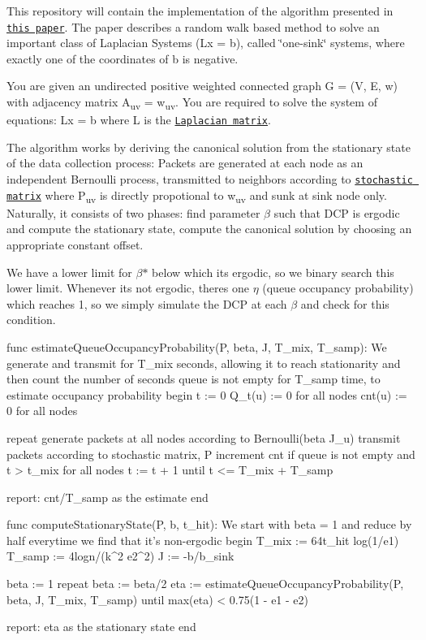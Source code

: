 This repository will contain the implementation of the algorithm presented in \href{https://arxiv.org/abs/1905.04989}{\tt this paper}. The paper describes a random walk based method to solve an important class of Laplacian Systems (Lx = b), called \char`\"{}one-\/sink\char`\"{} systems, where exactly one of the coordinates of b is negative.

You are given an undirected positive weighted connected graph G = (V, E, w) with adjacency matrix A\textsubscript{uv} = w\textsubscript{uv}. You are required to solve the system of equations\+: Lx = b where L is the \href{https://en.wikipedia.org/wiki/Laplacian_matrix#Definition}{\tt Laplacian matrix}.

The algorithm works by deriving the canonical solution from the stationary state of the data collection process\+: Packets are generated at each node as an independent Bernoulli process, transmitted to neighbors according to \href{https://en.wikipedia.org/wiki/Stochastic_matrix#Definition_and_properties}{\tt stochastic matrix} where P\textsubscript{uv} is directly propotional to w\textsubscript{uv} and sunk at sink node only. Naturally, it consists of two phases\+: find parameter {$\beta$} such that D\+CP is ergodic and compute the stationary state, compute the canonical solution by choosing an appropriate constant offset.

We have a lower limit for {$\beta$}$\ast$ below which it\textquotesingle{}s ergodic, so we binary search this lower limit. Whenever it\textquotesingle{}s not ergodic, there\textquotesingle{}s one {$\eta$} (queue occupancy probability) which reaches 1, so we simply simulate the D\+CP at each {$\beta$} and check for this condition.


\begin{DoxyCode}
func estimateQueueOccupancyProbability(P, beta, J, T\_mix, T\_samp):
    We generate and transmit for T\_mix seconds, allowing it to reach
    stationarity and then count the number of seconds queue is not empty for
    T\_samp time, to estimate occupancy probability
begin
    t := 0
    Q\_t(u) := 0 for all nodes
    cnt(u) := 0 for all nodes

    repeat
        generate packets at all nodes according to Bernoulli(beta J\_u)
        transmit packets according to stochastic matrix, P
        increment cnt if queue is not empty and t > t\_mix for all nodes
        t := t + 1
    until t <= T\_mix + T\_samp

    report: cnt/T\_samp as the estimate
end

func computeStationaryState(P, b, t\_hit):
    We start with beta = 1 and reduce by half everytime we find that it's
    non-ergodic
begin
    T\_mix := 64t\_hit log(1/e1)
    T\_samp := 4logn/(k^2 e2^2)
    J := -b/b\_sink

    beta := 1
    repeat
        beta := beta/2
        eta := estimateQueueOccupancyProbability(P, beta, J, T\_mix, T\_samp)
    until max(eta) < 0.75(1 - e1 - e2)

    report: eta as the stationary state
end
\end{DoxyCode}


